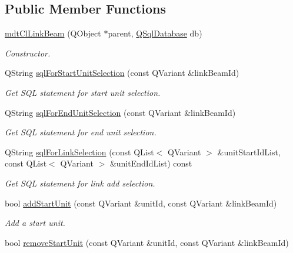 \subsection*{Public Member Functions}
\begin{DoxyCompactItemize}
\item 
\hyperlink{classmdt_cl_link_beam_a3b020f3fc214ebe0fc84eacc10ebfd14}{mdt\-Cl\-Link\-Beam} (Q\-Object $\ast$parent, \hyperlink{class_q_sql_database}{Q\-Sql\-Database} db)
\begin{DoxyCompactList}\small\item\em Constructor. \end{DoxyCompactList}\item 
Q\-String \hyperlink{classmdt_cl_link_beam_a859cda2a2dbcfc549d1cc2f24e5ea100}{sql\-For\-Start\-Unit\-Selection} (const Q\-Variant \&link\-Beam\-Id)
\begin{DoxyCompactList}\small\item\em Get S\-Q\-L statement for start unit selection. \end{DoxyCompactList}\item 
Q\-String \hyperlink{classmdt_cl_link_beam_a0f6d6be2bbb6a98eb4337b48fc300e28}{sql\-For\-End\-Unit\-Selection} (const Q\-Variant \&link\-Beam\-Id)
\begin{DoxyCompactList}\small\item\em Get S\-Q\-L statement for end unit selection. \end{DoxyCompactList}\item 
Q\-String \hyperlink{classmdt_cl_link_beam_ac072ca5510cfcb6572903c45f4fd817a}{sql\-For\-Link\-Selection} (const Q\-List$<$ Q\-Variant $>$ \&unit\-Start\-Id\-List, const Q\-List$<$ Q\-Variant $>$ \&unit\-End\-Id\-List) const 
\begin{DoxyCompactList}\small\item\em Get S\-Q\-L statement for link add selection. \end{DoxyCompactList}\item 
bool \hyperlink{classmdt_cl_link_beam_a8e4cfac27799db782d4739398fdac88f}{add\-Start\-Unit} (const Q\-Variant \&unit\-Id, const Q\-Variant \&link\-Beam\-Id)
\begin{DoxyCompactList}\small\item\em Add a start unit. \end{DoxyCompactList}\item 
bool \hyperlink{classmdt_cl_link_beam_a47c8665ff96aa94fe57452d9bb178700}{remove\-Start\-Unit} (const Q\-Variant \&unit\-Id, const Q\-Variant \&link\-Beam\-Id)

\end{DoxyCompactItemize}
